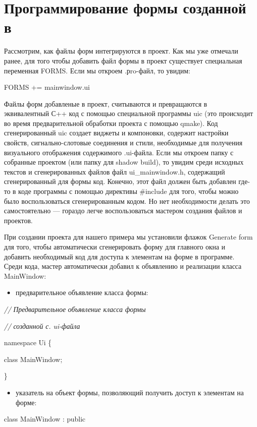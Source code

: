 \section[\ Программирование формы созданной в \Sys{Qt Designer}]{ Программирование формы созданной в }
Рассмотрим, как файлы форм интегрируются в проект. Как мы уже отмечали ранее, для того чтобы добавить
файл формы в проект существует специальная переменная FORMS. Если мы откроем .рro-файл, то увидим: 

FORMS  += mainwindow.ui

Файлы форм добавленые в проект, считываются и превращаются в эквивалентный С++ код с помощью специальной программы uic
(это происходит во время предварительной обработки проекта с помощью qmake). Код сгенерированный uic создает виджеты и
компоновки, содержит настройки свойств, сигнально-слотовые соединения и стили, необходимые для получения визуального
отображения содержимого .ui-файла. Если мы откроем папку с собранные проектом (или папку для shadow build), то увидим
среди исходных текстов и сгенерированных файлов файл ui\_mainwindow.h, содержащий сгенерированный для формы код.
Конечно, этот файл должен быть добавлен где-то в коде программы с помощью директивы \#include для того, чтобы можно
было воспользоваться сгенерированным кодом. Но нет необходимости делать это самостоятельно --- гораздо легче
воспользоваться мастером создания файлов и проектов. 

При создании проекта для нашего примера мы установили флажок Generate form для того, чтобы автоматически сгенерировать
форму для главного окна и добавить необходимый код для доступа к элементам на форме в программе. Среди кода, мастер
автоматически добавил к объявлению и реализации класса MainWindow: 

\begin{itemize}
\item предварительное объявление класса формы: 
\end{itemize}
\textit{//} \textit{Предварительное} \textit{объявление класса формы}\textit{ }

\textit{//} \textit{созданной с. ui-файла}\textit{ }

namespace Ui \{

 class MainWindow;

\}

\begin{itemize}
\item указатель на объект формы, позволяющий получить доступ к элементам на форме: 
\end{itemize}
class MainWindow : public 

